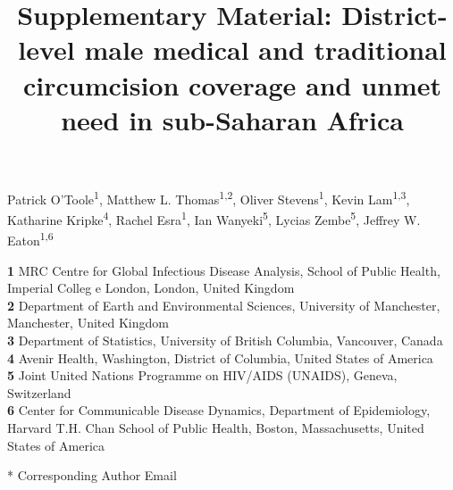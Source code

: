 \documentclass{article}
\title{Supplementary Material: District-level male medical and traditional circumcision coverage and unmet need in sub-Saharan Africa}
\author{}
\date{}
\begin{document}

\maketitle

\vspace{-1cm}

Patrick O'Toole\textsuperscript{1},
Matthew L. Thomas\textsuperscript{1,2},
Oliver Stevens\textsuperscript{1},
Kevin Lam\textsuperscript{1,3},
Katharine Kripke\textsuperscript{4},
Rachel Esra\textsuperscript{1},
Ian Wanyeki\textsuperscript{5},
Lycias Zembe\textsuperscript{5},
Jeffrey W. Eaton\textsuperscript{1,6} \\
\smallskip
  
\textbf{1} MRC Centre for Global Infectious Disease Analysis, School of Public Health, Imperial Colleg  e London, London, United Kingdom\\
\textbf{2} Department of Earth and Environmental Sciences, University of Manchester, Manchester, United Kingdom\\
\textbf{3} Department of Statistics, University of British Columbia, Vancouver, Canada\\
\textbf{4} Avenir Health, Washington, District of Columbia, United States of America\\
\textbf{5} Joint United Nations Programme on HIV/AIDS (UNAIDS), Geneva, Switzerland\\
\textbf{6} Center for Communicable Disease Dynamics, Department of Epidemiology, Harvard T.H. Chan School of Public Health, Boston, Massachusetts, United States of America\\

\smallskip

* Corresponding Author Email

\newpage

\end{document}
